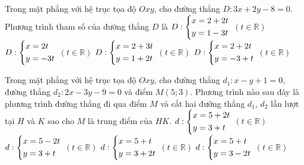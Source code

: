 \begin{ex}%
	Trong mặt phẳng với hệ trục tọa độ $Oxy$, cho đường thẳng $D:3x+2y-8=0$. Phương trình tham số của đường thẳng $D$ là
	\choice
	{\True $D:\left\{\begin{aligned}&x=2+2t\\&y=1-3t\end{aligned}\right.$ $(t\in\mathbb{R})$}
	{$D:\left\{\begin{aligned}&x=2t\\&y=-3t\end{aligned}\right.$ $(t\in\mathbb{R})$}
	{$D:\left\{\begin{aligned}&x=2+3t\\&y=1+2t\end{aligned}\right.$ $(t\in\mathbb{R})$}
	{$D:\left\{\begin{aligned}&x=2+2t\\&y=-3+t\end{aligned}\right.$ $(t\in\mathbb{R})$}
\end{ex}
\begin{ex}%
	Trong mặt phẳng với hệ trục tọa độ $Oxy$, cho đường thẳng $d_1:x-y+1=0$, đường thẳng $d_2:2x-3y-9=0$ và điểm $M(5;3)$. Phương trình nào sau đây là phương trình đường thẳng đi qua điểm $M$ và cắt hai đường thẳng $d_1$, $d_2$ lần lượt tại $H$ và $K$ sao cho $M$ là trung điểm của $HK$.
	\choice
	{$d:\left\{\begin{aligned}&x=5+2t\\&y=3+t\end{aligned}\right.$ $(t\in\mathbb{R})$}
	{$d:\left\{\begin{aligned}&x=5-2t\\&y=3+t\end{aligned}\right.$ $(t\in\mathbb{R})$}
	{$d:\left\{\begin{aligned}&x=5+t\\&y=3+2t\end{aligned}\right.$ $(t\in\mathbb{R})$}
	{\True $d:\left\{\begin{aligned}&x=5+t\\&y=3-2t\end{aligned}\right.$ $(t\in\mathbb{R})$}
\end{ex}

